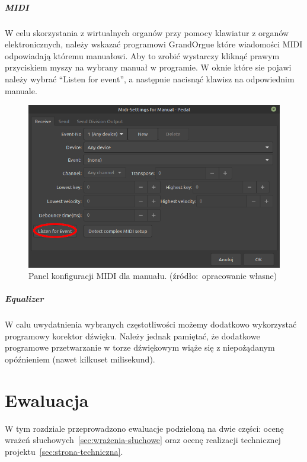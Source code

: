 \documentclass[11pt]{report}
\begin{document}
    \paragraph{MIDI}
    W celu skorzystania z wirtualnych organów przy pomocy klawiatur z organów elektronicznych,
    należy wskazać programowi GrandOrgue które wiadomości MIDI odpowiadają któremu manuałowi.
    Aby to zrobić wystarczy kliknąć prawym przyciskiem myszy na wybrany manuał w programie.
    W oknie które sie pojawi należy wybrać ``Listen for event'', a następnie nacisnąć klawisz na odpowiednim manuale.
    \begin{figure}[!ht]
        \centering
        \includegraphics[width=\linewidth]{fig/midiR.png}
        \caption{Panel konfiguracji MIDI dla manuału. (źródło:~opracowanie własne)}
        \label{fig:midi}
    \end{figure}

    \paragraph{Equalizer}
    W calu uwydatnienia wybranych częstotliwości możemy dodatkowo wykorzystać programowy korektor dźwięku.
    Należy jednak pamiętać, że dodatkowe programowe przetwarzanie w torze dźwiękowym wiąże się z niepożądanym opóźnieniem (nawet kilkuset milisekund).


    \chapter{Ewaluacja}
    W tym rozdziale przeprowadzono ewaluacje podzieloną na dwie części: ocenę wrażeń słuchowych~\ref{sec:wrażenia-słuchowe} oraz ocenę realizacji technicznej projektu~\ref{sec:strona-techniczna}.
\end{document}
